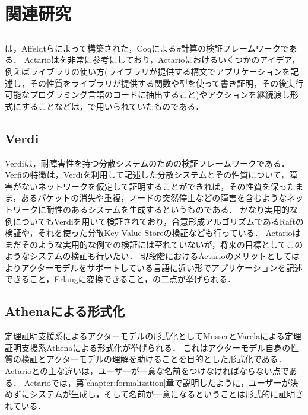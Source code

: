 \chapter{関連研究}
\label{chapter:related-work}

\section{\applpi}

\applpi\cite{Affeldt200817}は，Affeldtらによって構築された，Coqによる$\pi$計算の検証フレームワークである．
Actarioは\applpi を非常に参考にしており，Actarioにおけるいくつかのアイデア，例えばライブラリの使い方(ライブラリが提供する構文でアプリケーションを記述し，その性質をライブラリが提供する関数や型を使って書き証明，その後実行可能なプログラミング言語のコードに抽出すること)やアクションを継続渡し形式にすることなどは，\applpi で用いられていたものである．

\section{Verdi}

Verdi\cite{Verdi}は，耐障害性を持つ分散システムのための検証フレームワークである．
Verfiの特徴は，Verdiを利用して記述した分散システムとその性質について，障害がないネットワークを仮定して証明することができれば，その性質を保ったまま，あるパケットの消失や重複，ノードの突然停止などの障害を含むようなネットワークに耐性のあるシステムを生成するというものである．
かなり実用的な例についてもVerdiを用いて検証されており，合意形成アルゴリズムであるRaftの検証や，それを使った分散Key-Value Storeの検証なども行っている．
Actarioはまだそのような実用的な例での検証には至れていないが，将来の目標としてこのようなシステムの検証も行いたい．
現段階におけるActarioのメリットとしてはよりアクターモデルをサポートしている言語に近い形でアプリケーションを記述できること，Erlangに変換できること，の二点が挙げられる．


\section{Athenaによる形式化}

定理証明支援系によるアクターモデルの形式化としてMusserとVarelaによる定理証明支援系Athena\cite{Athena}による形式化\cite{Musser:2013aa}が挙げられる．
これはアクターモデル自身の性質の検証とアクターモデルの理解を助けることを目的とした形式化である．
Actarioとの主な違いは，ユーザーが一意な名前をつけなければならない点である．
Actarioでは，第\ref{chapter:formalization}章で説明したように，ユーザーが決めずにシステムが生成し，そして名前が一意になるということは形式的に証明されている．

